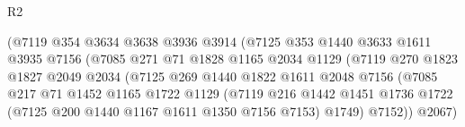 \begin{lexlean}{R2}
\begin{coremodule}
                                      (@7119
                                        @354
                                        @3634
                                        @3638
                                        @3936
                                        @3914
                                        (@7125
                                          @353
                                          @1440
                                          @3633
                                          @1611
                                          @3935
                                          @7156
                                          (@7085
                                            @271
                                            @71
                                            @1828
                                            @1165
                                            @2034
                                            @1129
                                            (@7119
                                              @270
                                              @1823
                                              @1827
                                              @2049
                                              @2034
                                              (@7125
                                                @269
                                                @1440
                                                @1822
                                                @1611
                                                @2048
                                                @7156
                                                (@7085
                                                  @217
                                                  @71
                                                  @1452
                                                  @1165
                                                  @1722
                                                  @1129
                                                  (@7119
                                                    @216
                                                    @1442
                                                    @1451
                                                    @1736
                                                    @1722
                                                    (@7125 @200 @1440 @1167 @1611 @1350 @7156 @7153)
                                                    @1749)
                                                  @7152))
                                              @2067)

\end{coremodule}
\end{lexlean}

